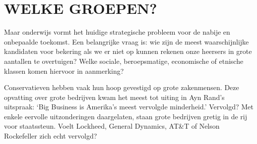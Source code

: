 \documentclass[
  a5paper,
  smalldemyvopaper,10pt,twoside,onecolumn,openright,extrafontsizes,hidelinks]{memoir}
\begin{document}
\section{WELKE GROEPEN?}\label{welke-groepen}

Maar onderwijs vormt het huidige strategische probleem voor de nabije en
onbepaalde toekomst. Een belangrijke vraag is: wie zijn de meest
waarschijnlijke kandidaten voor bekering als we er niet op kunnen
rekenen onze heersers in grote aantallen te overtuigen? Welke sociale,
beroepsmatige, economische of etnische klassen komen hiervoor in
aanmerking?

Conservatieven hebben vaak hun hoop gevestigd op grote zakenmensen. Deze
opvatting over grote bedrijven kwam het meest tot uiting in Ayn Rand's
uitspraak: `Big Business is Amerika's meest vervolgde minderheid.'
Vervolgd? Met enkele eervolle uitzonderingen daargelaten, staan grote
bedrijven gretig in de rij voor staatssteun. Voelt Lockheed, General
Dynamics, AT\&T of Nelson Rockefeller zich echt vervolgd?
\end{document}
